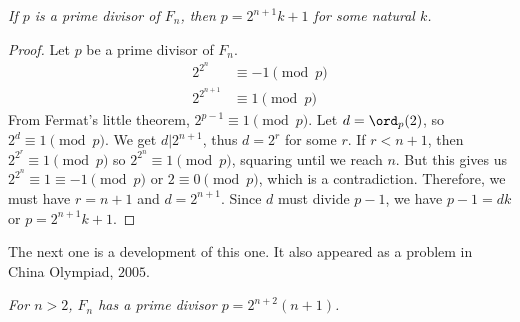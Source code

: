 \documentclass{subfile}
\begin{document}
		\begin{theorem}[Euler]\slshape
			If $p$ is a prime divisor of $F_n$, then $p=2^{n+1}k+1$ for some natural $k$.
		\end{theorem}
		
		\begin{proof}
			Let $p$ be a prime divisor of $F_n$.
				\begin{align*}
					2^{2^n} & \equiv-1\pmod p\\
					2^{2^{n+1}} &\equiv1\pmod p
				\end{align*}
			From Fermat's little theorem, $2^{p-1}\equiv1\pmod p$. Let $d=\ord_p(2)$, so $2^d\equiv1\pmod p$. We get $d|2^{n+1}$, thus $d=2^r$ for some $r$. If $r<n+1$, then $2^{2^r}\equiv1\pmod p$ so $2^{2^n}\equiv1\pmod p$, squaring until we reach $n$. But this gives us $2^{2^n}\equiv1\equiv-1\pmod p$ or $2\equiv0\pmod p$, which is a contradiction. Therefore, we must have $r=n+1$ and $d=2^{n+1}$. Since $d$ must divide $p-1$, we have $p-1=dk$ or $p=2^{n+1}k+1$.
			
		\end{proof}
	The next one is a development of this one. It also appeared as a problem in China Olympiad, $2005$.
		\begin{theorem}[Lucas]\slshape
			For $n>2$, $F_n$ has a prime divisor $p=2^{n+2}(n+1)$.
		\end{theorem}
		
\end{document}
